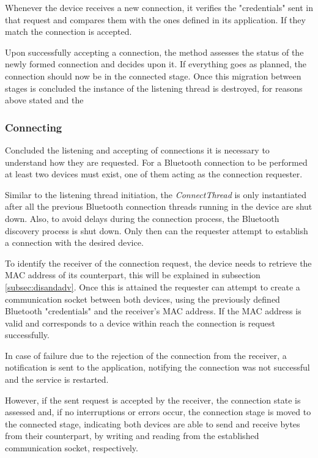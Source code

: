 Whenever the device receives a new connection, it verifies the "credentials" sent in that request and compares them with the ones defined in its application. If they match the connection is accepted.

Upon successfully accepting a connection, the method assesses the status of the newly formed connection and decides upon it. If everything goes as planned, the connection should now be in the connected stage. Once this migration between stages is concluded the instance of the listening thread is destroyed, for reasons above stated and the 

\subsubsection{Connecting}
\label{subsubsec:connecting}

Concluded the listening and accepting of connections it is necessary to understand how they are requested. For a Bluetooth connection to be performed at least two devices must exist, one of them acting as the connection requester.

Similar to the listening thread initiation, the \textit{ConnectThread} is only instantiated after all the previous Bluetooth connection threads running in the device are shut down. Also, to avoid delays during the connection process, the Bluetooth discovery process is shut down. Only then can the requester attempt to establish a connection with the desired device.

To identify the receiver of the connection request, the device needs to retrieve the \gls{MAC} address of its counterpart, this will be explained in subsection \ref{subsec:disandadv}. Once this is attained the requester can attempt to create a communication socket between both devices, using the previously defined Bluetooth "credentials" and the receiver's \gls{MAC} address. If the \gls{MAC} address is valid and corresponds to a device within reach the connection is request successfully.

In case of failure due to the rejection of the connection from the receiver, a notification is sent to the application, notifying the connection was not successful and the service is restarted.

However, if the sent request is accepted by the receiver, the connection state is assessed and, if no interruptions or errors occur, the connection stage is moved to the connected stage, indicating both devices are able to send and receive bytes from their counterpart, by writing and reading from the established communication socket, respectively.

